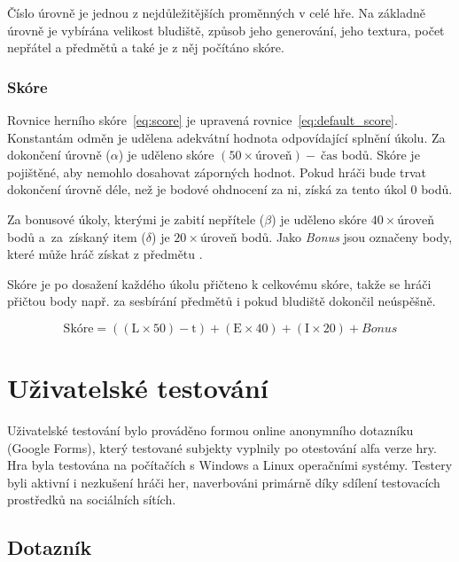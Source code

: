 Číslo úrovně je jednou z nejdůležitějších proměnných v celé hře. Na základně úrovně je vybírána velikost bludiště, způsob jeho generování, jeho textura, počet nepřátel a předmětů a také je z něj počítáno skóre.

\subsection*{Skóre}
Rovnice herního skóre~\ref{eq:score} je upravená rovnice~\ref{eq:default_score}. Konstantám odměn je udělena adekvátní hodnota odpovídající splnění úkolu. Za dokončení úrovně ($\alpha$) je uděleno skóre $(50 \times\text{úroveň}) -~\text{čas}$ bodů. Skóre je pojištěné, aby nemohlo dosahovat záporných hodnot. Pokud hráči bude trvat dokončení úrovně déle, než je bodové ohdnocení za ni, získá za tento úkol 0 bodů.

Za bonusové úkoly, kterými je zabití nepřítele ($\beta$) je uděleno skóre $40 \times \text{úroveň}$ bodů a~za~získaný item ($\delta$) je $20 \times \text{úroveň}$ bodů. Jako \textit{Bonus} jsou označeny body, které může hráč získat z předmětu .

Skóre je po dosažení každého úkolu přičteno k celkovému skóre, takže se hráči přičtou body např. za sesbírání předmětů i pokud bludiště dokončil neúspěšně.

\begin{equation}
    \text{Skóre} = ((\text{L} \times 50) - \text{t}) + (\text{E} \times 40) + (\text{I} \times 20) + \textit{Bonus}
    \label{eq:score}
\end{equation}

\chapter{Uživatelské testování}\label{chap:Uživatelské testování}
Uživatelské testování bylo prováděno formou online anonymního dotazníku (Google Forms), který testované subjekty vyplnily po otestování alfa verze hry. Hra byla testována na počítačích s Windows a Linux operačními systémy. Testery byli aktivní i nezkušení hráči her, naverbováni primárně díky sdílení testovacích prostředků na sociálních sítích.
\section{Dotazník}


